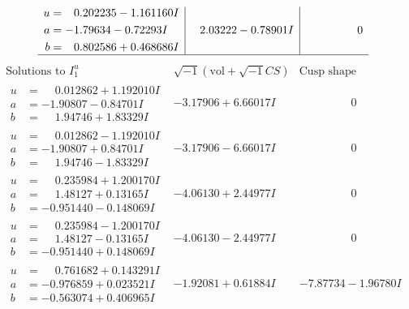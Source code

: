\documentclass[1p]{elsarticle_modified}
\theoremstyle{definition}
\newcommand{\I}{\sqrt{-1}}
\begin{document}
$$\begin{array}{c|c|c}
\begin{aligned}
u &= \phantom{-}0.202235 - 1.161160 I \\
a &= -1.79634 - 0.72293 I \\
b &= \phantom{-}0.802586 + 0.468686 I\end{aligned}
 & \phantom{-}2.03222 - 0.78901 I & \phantom{-0.000000 } 0\\
 \hline 
 \end{array}$$\newpage$$\begin{array}{c|c|c}  
\text{Solutions to }I^u_{1}& \I (\text{vol} + \sqrt{-1}CS) & \text{Cusp shape}\\
 \hline 
\begin{aligned}
u &= \phantom{-}0.012862 + 1.192010 I \\
a &= -1.90807 - 0.84701 I \\
b &= \phantom{-}1.94746 + 1.83329 I\end{aligned}
 & -3.17906 + 6.66017 I & \phantom{-0.000000 } 0 \\ \hline\begin{aligned}
u &= \phantom{-}0.012862 - 1.192010 I \\
a &= -1.90807 + 0.84701 I \\
b &= \phantom{-}1.94746 - 1.83329 I\end{aligned}
 & -3.17906 - 6.66017 I & \phantom{-0.000000 } 0 \\ \hline\begin{aligned}
u &= \phantom{-}0.235984 + 1.200170 I \\
a &= \phantom{-}1.48127 + 0.13165 I \\
b &= -0.951440 - 0.148069 I\end{aligned}
 & -4.06130 + 2.44977 I & \phantom{-0.000000 } 0 \\ \hline\begin{aligned}
u &= \phantom{-}0.235984 - 1.200170 I \\
a &= \phantom{-}1.48127 - 0.13165 I \\
b &= -0.951440 + 0.148069 I\end{aligned}
 & -4.06130 - 2.44977 I & \phantom{-0.000000 } 0 \\ \hline\begin{aligned}
u &= \phantom{-}0.761682 + 0.143291 I \\
a &= -0.976859 + 0.023521 I \\
b &= -0.563074 + 0.406965 I\end{aligned}
 & -1.92081 + 0.61884 I & -7.87734 - 1.96780 I \\ \hline\begin{aligned}

\end{aligned}
\end{array}$$
\end{document}
